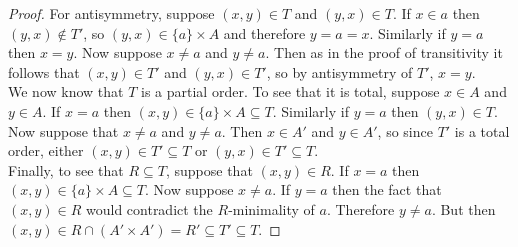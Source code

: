 \documentclass{report}
\theoremstyle{definition}
\begin{document}
\begin{proof}
\indent For antisymmetry, suppose $(x,y)\in T$ and $(y,x)\in T$. If $x\in a$ then $(y,x)\notin T'$, so $(y,x)\in\{a\}\times A$ and therefore 
$y=a=x$. Similarly if $y=a$ then $x=y$. Now suppose $x\neq a$ and $y\neq a$. 
Then as in the proof of transitivity it follows that $(x,y)\in T'$ and $(y,x)\in T'$, so by antisymmetry of $T'$, $x=y$.\\
\indent We now know that $T$ is a partial order. To see that it is total, suppose $x\in A$ and $y\in A$. 
If $x=a$ then $(x,y)\in\{a\}\times A\subseteq T$. Similarly if $y=a$ then $(y,x)\in T$. Now suppose that $x\neq a$ and $y\neq a$. Then $x\in A'$
and $y\in A'$, so since $T'$ is a total order, either $(x,y)\in T'\subseteq T$ or $(y,x)\in T'\subseteq T$.\\
\indent Finally, to see that $R\subseteq T$, suppose that $(x,y)\in R$. If $x=a$ then $(x,y)\in\{a\}\times A\subseteq T$. 
Now suppose $x\neq a$. If $y=a$ then the fact that $(x,y)\in R$ would contradict the $R$-minimality of $a$. Therefore $y\neq a$. But then $(x,y)\in R\cap(A'\times A')=R'\subseteq T'\subseteq T$.
\end{proof}
\newpage
\end{document}

